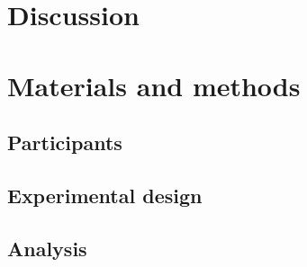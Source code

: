 \documentclass[10pt]{article}
\begin{document}





\section*{Discussion}





\section*{Materials and methods}
\subsection*{Participants}

\subsection*{Experimental design}

\subsection*{Analysis}



\end{document}
